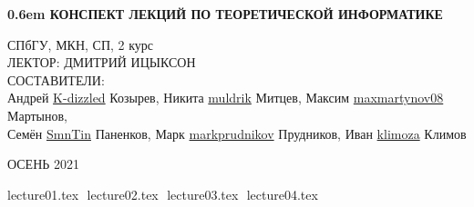 \documentclass[12pt,letterpaper]{report}
\theoremstyle{definition}
\begin{document}
\clearpage
\newcommand\nbvspace[1][3]{\vspace*{\stretch{#1}}}
\newcommand\nbstretchyspace{\spaceskip0.5em plus 0.25em minus 0.25em}
\newcommand{\nbtitlestretch}{\spaceskip0.6em}
\pagestyle{empty}
\begin{center}
\bfseries
\nbvspace[1]
\Huge
{\nbtitlestretch\huge
КОНСПЕКТ ЛЕКЦИЙ ПО ТЕОРЕТИЧЕСКОЙ ИНФОРМАТИКЕ}

\nbvspace[1]
\normalsize

СПбГУ, МКН, СП, 2 курс\\
ЛЕКТОР: ДМИТРИЙ ИЦЫКСОН
\nbvspace[1]
\\
\Large СОСТАВИТЕЛИ:\\[0.5em]
\footnotesize
Андрей \href{https://github.com/K-dizzled}{K-dizzled} Козырев,
Никита  \href{https://github.com/muldrik}{muldrik} Митцев,
Максим \href{https://github.com/maxmartynov08}{maxmartynov08} Мартынов,\\
Семён \href{https://github.com/SmnTin}{SmnTin} Паненков,
Марк \href{https://github.com/markprudnikov}{markprudnikov} Прудников,
Иван \href{https://github.com/klimoza}{klimoza} Климов

\nbvspace[2]

\nbvspace[3]
\normalsize

\large
ОСЕНЬ 2021
\nbvspace[1]
\end{center}
\newpage
\pagestyle{plain}
\fi
\tableofcontents
\newpage
\begin{normalsize}
{lecture01.tex}
$ $
{lecture02.tex}
$ $
{lecture03.tex}
$ $
{lecture04.tex}
$ $
\end{normalsize}
\end{document}
